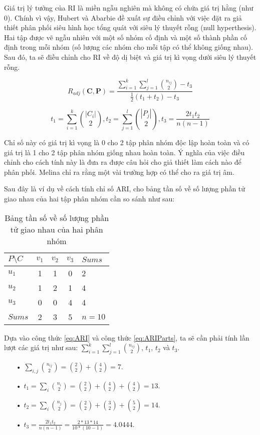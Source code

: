 Giá trị lý tưởng của RI là miền ngẫu nghiên mà không có chứa giá trị hằng (như $0$).
Chính vì vậy, Hubert và Abarbie đề xuất sự điều chỉnh với việc đặt ra giả thiết phân phối siêu hình học tổng quát với siêu lý thuyết rỗng (null hyperthesis).
Hai tập được vẽ ngẫu nhiên với một số nhóm cố định và một số thành phần cố định trong mỗi nhóm (số lượng các nhóm cho mỗi tập có thể không giống nhau).
Sau đó, ta sẽ điều chỉnh cho RI về độ dị biệt và giá trị kì vọng dưới siêu lý thuyết rỗng.
\begin{center}
\begin{equation} \label{eq:ARI}
R_{adj}(\textbf{C}, \textbf{P}) = \frac{\sum^k_{i=1} \sum^l_{j=1} \binom {n_{ij}}  {2} - t_3}{\frac{1}{2} (t_1 + t_2) - t_3}
\end{equation}

\begin{equation} \label{eq:ARIParts}
t_1 = \sum^k_{i=1} \binom {|C_i|} {2} , t_2 = \sum_{j=1}^l \binom {|P_j|} {2}, t_3 = \frac{2 t_1 t_2}{n (n - 1)}
\end{equation}
\end{center}

Chỉ số này có giá trị kì vọng là 0 cho 2 tập phân nhóm độc lập hoàn toàn và có giá trị là 1 cho 2 tập phân nhóm giống nhau hoàn toàn.
Ý nghĩa của việc điều chỉnh cho cách tính này là đưa ra được câu hỏi cho giả thiết làm cách nào để phân phối.
Melina chỉ ra rằng một vài trường hợp có thể cho ra giá trị âm\cite{Melina-ARI}.

Sau đây là ví dụ về cách tính chỉ số ARI, cho bảng tần số về số lượng phần tử giao nhau của hai tập phân nhóm cần so sánh như sau:
\begin{table}[ht]
\begin{center}
\begin{tabular}{l|c c c|l}
\hline
$P \setminus C$ & $v_1$ & $v_2$ & $v_3$ & $Sums$ \\
\hline
$u_1$ & 1 & 1 & 0 & 2 \\
$u_2$ & 1 & 2 & 1 & 4 \\
$u_3$ & 0 & 0 & 4 & 4 \\
\hline
$Sums$ & 2 & 3 & 5 & $n = 10$ \\
\end{tabular}
\caption[Bảng tần số]{Bảng tần số về số lượng phần tử giao nhau của hai phân nhóm}
\label{bang_4_5}
\end{center}
\end{table}

Dựa vào công thức \ref{eq:ARI} và công thức \ref{eq:ARIParts}, ta sẽ cần phải tính lần lượt các giá trị như sau: $\sum^k_{i=1} \sum^l_{j=1} \binom {n_{ij}}{2}$, $t_1$, $t_2$ và $t_3$.
\begin{enumerate}
\item[•]$\sum_{i,j} \binom {n_{ij}}{2} = \binom {2}{2} + \binom {4}{2} = 7$.
\item[•]$t_1 = \sum_{i} \binom {n_i}{2} = \binom {2}{2} + \binom {4}{2} + \binom {4}{2} = 13$.
\item[•]$t_2 = \sum_{i} \binom {n_j}{2} = \binom {2}{2} + \binom {3}{2} + \binom {5}{2} = 14$.
\item[•]$t_3 = \frac{2 t_1 t_2}{n (n - 1)} = \frac{2 * 13 * 14}{10 * (10 - 1)} = 4.0444$.
\end{enumerate}

